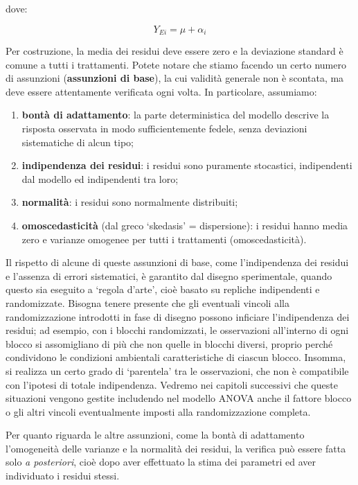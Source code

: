 \documentclass[a4paper,12pt,oneside]{book}
\providecommand{\tightlist}{%
  \setlength{\itemsep}{0pt}\setlength{\parskip}{0pt}}
\begin{document}
dove:

\[Y_{Ei} = \mu + \alpha_i\]

Per costruzione, la media dei residui deve essere zero e la deviazione standard è comune a tutti i trattamenti. Potete notare che stiamo facendo un certo numero di assunzioni (\textbf{assunzioni di base}), la cui validità generale non è scontata, ma deve essere attentamente verificata ogni volta. In particolare, assumiamo:

\begin{enumerate}
\def\labelenumi{\arabic{enumi}.}
\tightlist
\item
  \textbf{bontà di adattamento}: la parte deterministica del modello descrive la risposta osservata in modo sufficientemente fedele, senza deviazioni sistematiche di alcun tipo;
\item
  \textbf{indipendenza dei residui}: i residui sono puramente stocastici, indipendenti dal modello ed indipendenti tra loro;
\item
  \textbf{normalità}: i residui sono normalmente distribuiti;
\item
  \textbf{omoscedasticità} (dal greco `skedasis' = dispersione): i residui hanno media zero e varianze omogenee per tutti i trattamenti (omoscedasticità).
\end{enumerate}

Il rispetto di alcune di queste assunzioni di base, come l'indipendenza dei residui e l'assenza di errori sistematici, è garantito dal disegno sperimentale, quando questo sia eseguito a `regola d'arte', cioè basato su repliche indipendenti e randomizzate. Bisogna tenere presente che gli eventuali vincoli alla randomizzazione introdotti in fase di disegno possono inficiare l'indipendenza dei residui; ad esempio, con i blocchi randomizzati, le osservazioni all'interno di ogni blocco si assomigliano di più che non quelle in blocchi diversi, proprio perché condividono le condizioni ambientali caratteristiche di ciascun blocco. Insomma, si realizza un certo grado di `parentela' tra le osservazioni, che non è compatibile con l'ipotesi di totale indipendenza. Vedremo nei capitoli successivi che queste situazioni vengono gestite includendo nel modello ANOVA anche il fattore blocco o gli altri vincoli eventualmente imposti alla randomizzazione completa.

Per quanto riguarda le altre assunzioni, come la bontà di adattamento l'omogeneità delle varianze e la normalità dei residui, la verifica può essere fatta solo \emph{a posteriori}, cioè dopo aver effettuato la stima dei parametri ed aver individuato i residui stessi.
\end{document}
